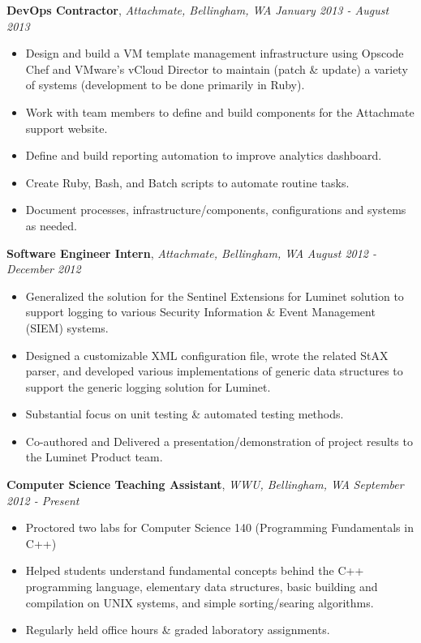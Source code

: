 \documentclass[9pt]{article}
\newenvironment{changemargin}[2]{%
  \begin{list}{}{%
    \setlength{\topsep}{0pt}%
    \setlength{\leftmargin}{#1}%
    \setlength{\rightmargin}{#2}%
    \setlength{\listparindent}{\parindent}%
    \setlength{\itemindent}{\parindent}%
    \setlength{\parsep}{\parskip}%
  }%
  \item[]}{\end{list}
}
\newenvironment{body} {
	\vspace*{-16pt}
	\begin{changemargin}{-0.20in}{-0.5in}
  }	
	{\end{changemargin}
}
\begin{document}
\begin{body}
	\vspace{14pt}

	\textbf{DevOps Contractor}, \emph{Attachmate, Bellingham, WA} \hfill \emph{January 2013 - August 2013}\\
	\vspace*{-4pt}
	\begin{itemize} \itemsep -0pt  %
		\item Design and build a VM template management infrastructure using Opscode Chef and VMware's vCloud Director to maintain (patch \& update) a variety of systems (development to be done primarily in Ruby).
		\item Work with team members to define and build components for the Attachmate support website.
		\item Define and build reporting automation to improve analytics dashboard.
		\item Create Ruby, Bash, and Batch scripts to automate routine tasks. 
		\item Document processes, infrastructure/components, configurations and systems as needed. 
	\end{itemize}

	\textbf{Software Engineer Intern}, \emph{Attachmate, Bellingham, WA} \hfill \emph{August 2012 - December 2012}\\
	\vspace*{-4pt}
	\begin{itemize} \itemsep -0pt  %
		\item Generalized the solution for the Sentinel Extensions for Luminet solution to support logging to various Security Information \& Event Management (SIEM) systems.
		\item Designed a customizable XML configuration file, wrote the related StAX parser, and developed various implementations of generic data structures to support the generic logging solution for Luminet. 
		\item Substantial focus on unit testing \& automated testing methods. 
		\item Co-authored and Delivered a presentation/demonstration of project results to the Luminet Product team.		
	\end{itemize}
	
	\textbf{Computer Science Teaching Assistant}, \emph{WWU, Bellingham, WA} \hfill \emph{September 2012 - Present}\\
	\vspace*{-4pt}
	\begin{itemize} \itemsep -0pt  %
		\item Proctored two labs for Computer Science 140 (Programming Fundamentals in C++)
		\item Helped students understand fundamental concepts behind the C++ programming language, elementary data structures, basic building and compilation on UNIX systems, and simple sorting/searing algorithms.  
		\item Regularly held office hours \& graded laboratory assignments. 
	\end{itemize}
	

\end{body}
\end{document}
